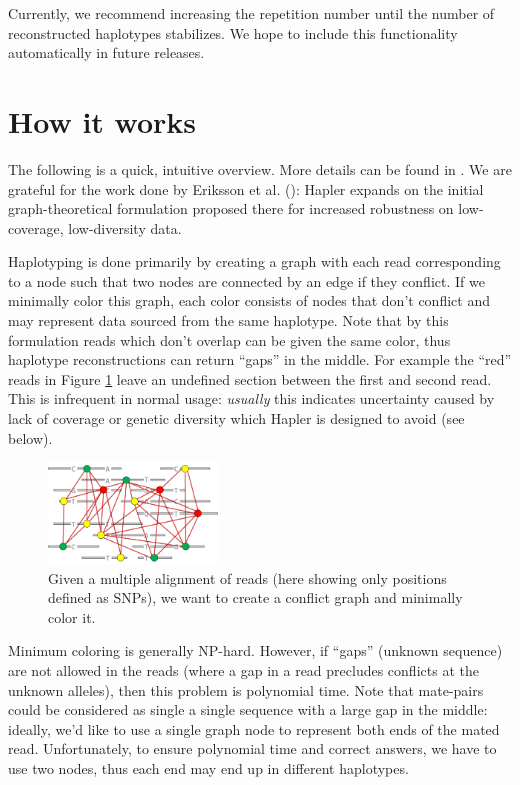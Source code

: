 \documentclass[11pt]{llncs}
\begin{document}
Currently, we recommend increasing the repetition number until the number of reconstructed haplotypes stabilizes. We hope to include this 
functionality automatically in future releases.




 
\newpage

\section{How it works}
\label{howItWorks}

The following is a quick, intuitive overview. More details can be found in \cite{ONEIL2011}. We are grateful for the work done by Eriksson et al. 
(\cite{ERIKSSON2008}): Hapler expands on the initial graph-theoretical formulation proposed there for increased robustness on low-coverage, low-diversity
data.

Haplotyping is done primarily by creating a graph with each read corresponding to a node such that two nodes are connected by an edge if they conflict. If 
we minimally color this graph, each color consists of nodes that don't conflict and may represent data sourced from the same haplotype. Note that by this 
formulation reads which don't overlap can be given the same color, thus haplotype reconstructions can return ``gaps'' in the middle. For example the
``red'' reads in Figure \ref{exampleConflictGraph} leave an undefined section between the first and second read. This is infrequent in normal usage: 
\emph{usually} this indicates uncertainty caused by lack of coverage or genetic diversity which Hapler is designed to avoid (see below).

\begin{figure}[!h]
\centering
   \includegraphics[width=0.4\textwidth]{graphics/mincolor}
   \caption{Given a multiple alignment of reads (here showing only positions defined as SNPs), we want to create a conflict graph and minimally color it.}
   \label{exampleConflictGraph}
\end{figure}



Minimum coloring is generally NP-hard. However, if ``gaps'' (unknown sequence) are not allowed in the reads (where a gap in a read precludes conflicts at the 
unknown alleles), then this problem is polynomial time. Note that mate-pairs could be considered as single a single sequence with a large gap in the 
middle: ideally, we'd like to use a single graph node to represent both ends of the mated read. Unfortunately, to ensure polynomial time and correct 
answers, we have to use two nodes, thus each end may end up in different haplotypes. 
\end{document}

